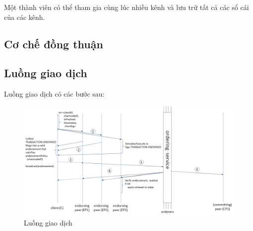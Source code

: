 Một thành viên có thể tham gia cùng lúc nhiều kênh và lưu trữ tất cả các sổ cái của các kênh.

\subsection{Cơ chế đồng thuận}






\subsection{Luồng giao dịch}

Luồng giao dịch có các bước sau:
\begin{figure}[h]
    \centering
    \includegraphics[width=1\textwidth]{images/flow-4.png}
    \caption{Luồng giao dịch }
\end{figure}



